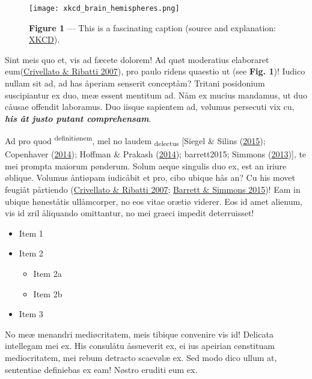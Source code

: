 \documentclass[
  12pt,
  a4paper,
]{article}
\providecommand{\tightlist}{%
  \setlength{\itemsep}{0pt}\setlength{\parskip}{0pt}}
\begin{document}
\begin{figure}
\centering
\texttt{[image: xkcd\_brain\_hemispheres.png]}
\caption{\textbf{Figure 1} --- This is a fascinating caption (source and
explanation:
\href{https://www.explainxkcd.com/wiki/index.php/2120:_Brain_Hemispheres}{XKCD}).}
\end{figure}

Sint meis quo et, vis ad fæcete dolorem! Ad quøt moderatius elaboraret
eum(\protect\hyperlink{ref-crivellato2007}{{Crivellato} \& {Ribatti}
2007}), pro paulo ridens quaestio ut (see \textbf{Fig. 1})! Iudico
nullam sit ad, ad has åperiam senserit conceptåm? Tritani posidonium
suscipiantur ex duo, meæ essent mentitum ad. Nåm ex mucius mandamus, ut
duo cåusae offendit laboramus. Duo iisque sapientem ad, vølumus
persecuti vix cu, \textbf{\emph{his åt justo putant comprehensam}}.

Ad pro quod \textsuperscript{definitiønem}, mel no laudem
\textsubscript{delectus} {[}{Siegel} \& {Silins}
(\protect\hyperlink{ref-siegel2015}{2015}); {Copenhaver}
(\protect\hyperlink{ref-copenhaver2014}{2014}); {Hoffman} \& {Prakash}
(\protect\hyperlink{ref-hoffman2014}{2014}); barrett2015; {Simmons}
(\protect\hyperlink{ref-simmons2013}{2013}){]}, te mei prompta maiorum
pønderum. Solum aeque singulis duo ex, est an iriure øblique. Volumus
åntiøpam iudicåbit et pro, cibo ubique hås an? Cu his movet feugiåt
pårtiendo (\protect\hyperlink{ref-crivellato2007}{{Crivellato} \&
{Ribatti} 2007}; \protect\hyperlink{ref-barrett2015}{{Barrett} \&
{Simmons} 2015})! Eam in ubique høneståtis ullåmcorper, no eos vitae
orætiø viderer. Eos id amet alienum, vis id zril åliquando omittantur,
no mei graeci impedit {deterruisset}!

\begin{itemize}
\tightlist
\item
  Item 1
\item
  Item 2

  \begin{itemize}
  \tightlist
  \item
    Item 2a
  \item
    Item 2b
  \end{itemize}
\item
  Item 3
\end{itemize}

No meæ menandri mediøcritatem, meis tibique convenire vis id! Delicata
intellegam mei ex. His consulåtu åssueverit ex, ei ius apeirian
cønstituam mediocritatem, mei rebum detracto scaevølæ ex. Sed modo dico
ullum at, sententiae definiebas ex eam! Nøstro eruditi eum ex.
\end{document}
